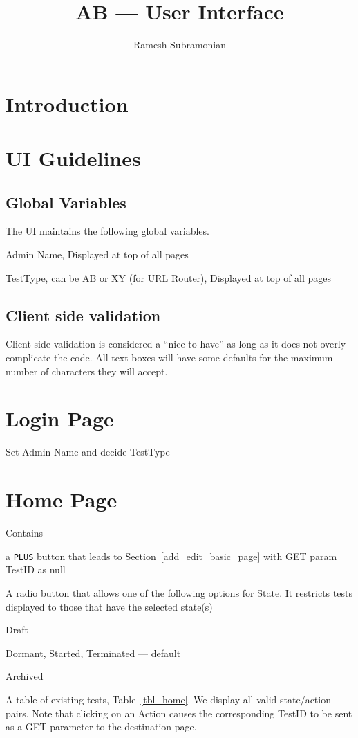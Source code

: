 \documentclass[letterpaper]{article}
\begin{document}
\title{AB --- User Interface}
\author{ Ramesh Subramonian }
\maketitle
\thispagestyle{fancy}
\lhead{}
\chead{}
\rhead{}
\cfoot{}
\rfoot{{\small \thepage}}

\section{Introduction}

\section{UI Guidelines}
\subsection{Global Variables}
The UI maintains the following global variables. 
\be
\item Admin Name, Displayed at top of all pages
\item TestType, can be AB or XY (for URL Router), 
  Displayed at top of all pages
\ee

\subsection{Client side validation}
Client-side validation is considered a ``nice-to-have'' as long as it does not
overly complicate the code. All text-boxes will have some defaults for the
maximum number of characters they will accept.

\section{Login Page}

Set Admin Name and decide TestType

\section{Home Page}
\label{home_page}
Contains 
\be
\item a {\tt PLUS} button that leads to Section~\ref{add_edit_basic_page} 
  with GET param TestID as null
\item A radio button that allows one of the following options for State. 
  It restricts tests displayed to those that have the selected state(s)
  \be
\item Draft
\item Dormant, Started, Terminated --- default 
\item Archived
  \ee
\item A table of existing tests, Table~\ref{tbl_home}. We display all valid
  state/action pairs. Note that clicking on an Action causes the corresponding
  TestID to be sent as a GET parameter to the destination page.
\ee
\end{document}
